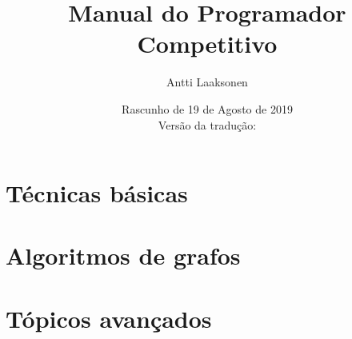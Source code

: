 \documentclass[twoside,12pt,a4paper,brazilian]{book}
\date{Rascunho de 19 de Agosto de 2019 \\ \vspace{1ex} \small Versão da tradução: \translationversion}
\title{\Huge Manual do Programador Competitivo}
\author{\Large Antti Laaksonen}
\begin{document}


\frontmatter
\maketitle
\setcounter{tocdepth}{1}
\tableofcontents



\mainmatter
{}
\setcounter{page}{1}

\newcommand{\key}[1] {\textbf{#1}}
\part{Técnicas básicas}










\part{Algoritmos de grafos}










\part{Tópicos avançados}











\cleardoublepage
{}
{}


\cleardoublepage
\printindex
\end{document}
